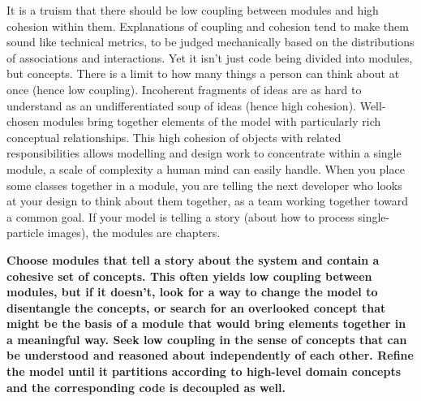 \documentclass[a4paper,11pt]{article}
\begin{document}
It is a truism that there should be low coupling between modules and high cohesion within them. Explanations of coupling and cohesion tend to make them sound like technical metrics, to be judged mechanically based on the distributions of associations and interactions. Yet it isn't just code being divided into modules, but concepts. There is a limit to how many things a person can think about at once (hence low coupling). Incoherent fragments of ideas are as hard to understand as an undifferentiated soup of ideas (hence high cohesion). Well-chosen modules bring together elements of the model with particularly rich conceptual relationships. This high cohesion of objects with related responsibilities allows modelling and design work to concentrate within a single module, a scale of complexity a human mind can easily handle. When you place some classes together in a module, you are telling the next developer who looks at your design to think about them together, as a team working together toward a common goal. If your model is telling a story (about how to process single-particle images), the modules are chapters.

\textbf{Choose modules that tell a story about the system and contain a cohesive set of concepts. This often yields low coupling between modules, but if it doesn't, look for a way to change the model to disentangle the concepts, or search for an overlooked concept that might be the basis of a module that would bring elements together in a meaningful way. Seek low coupling in the sense of concepts that can be understood and reasoned about independently of each other. Refine the model until it partitions according to high-level domain concepts and the corresponding code is decoupled as well.}
\end{document}
